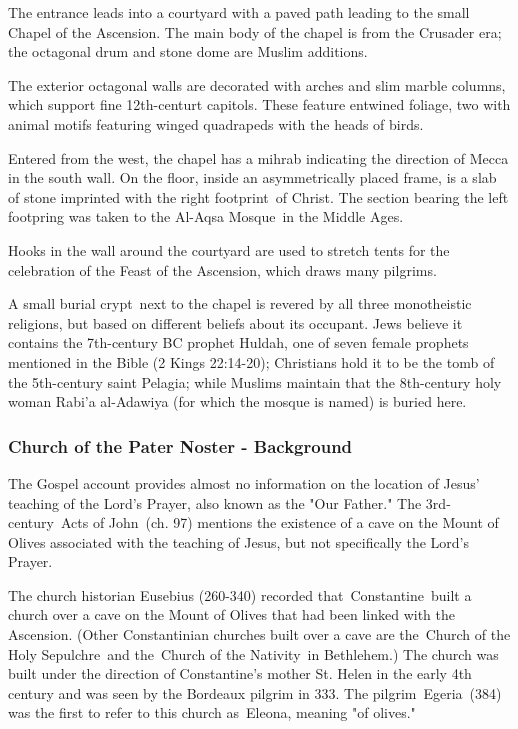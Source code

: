 \documentclass[letterpaper]{report}
\begin{document}
\begin{multicols}{2}
The entrance leads into a courtyard with a paved path leading to the small Chapel of the Ascension. The main body of the chapel is from the Crusader era; the octagonal drum and stone dome are Muslim additions.

The exterior octagonal walls are decorated with arches and slim marble columns, which support fine 12th-centurt capitols. These feature entwined foliage, two with animal motifs featuring winged quadrapeds with the heads of birds.

Entered from the west, the chapel has a mihrab indicating the direction of Mecca in the south wall. On the floor, inside an asymmetrically placed frame, is a slab of stone imprinted with the right footprint of Christ. The section bearing the left footpring was taken to the Al-Aqsa Mosque in the Middle Ages.

Hooks in the wall around the courtyard are used to stretch tents for the celebration of the Feast of the Ascension, which draws many pilgrims.

A small burial crypt next to the chapel is revered by all three monotheistic religions, but based on different beliefs about its occupant. Jews believe it contains the 7th-century BC prophet Huldah, one of seven female prophets mentioned in the Bible (2 Kings 22:14-20); Christians hold it to be the tomb of the 5th-century saint Pelagia; while Muslims maintain that the 8th-century holy woman Rabi'a al-Adawiya (for which the mosque is named) is buried here.

\subsubsection{Church of the Pater Noster - Background}

The Gospel account provides almost no information on the location of Jesus' teaching of the Lord's Prayer, also known as the "Our Father." The 3rd-century Acts of John (ch. 97) mentions the existence of a cave on the Mount of Olives associated with the teaching of Jesus, but not specifically the Lord's Prayer.

The church historian Eusebius (260-340) recorded that Constantine built a church over a cave on the Mount of Olives that had been linked with the Ascension. (Other Constantinian churches built over a cave are the Church of the Holy Sepulchre and the Church of the Nativity in Bethlehem.) The church was built under the direction of Constantine's mother St. Helen in the early 4th century and was seen by the Bordeaux pilgrim in 333. The pilgrim Egeria (384) was the first to refer to this church as Eleona, meaning "of olives."


\end{multicols}
\end{document}
